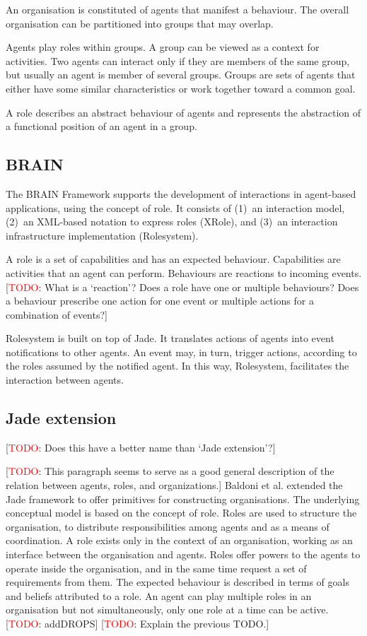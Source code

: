 \documentclass{article}
\newcommand{\todo}[1]{[\textcolor{red}{TODO}: #1]}
\begin{document}
An organisation is constituted of agents that manifest a behaviour.
The overall organisation can be partitioned into groups that may
overlap. 

Agents play roles within groups. A group can be viewed as a
context for activities. Two agents can interact only if they are
members of the same group, but usually an agent is member of
several groups. Groups are sets of agents that either have some
similar characteristics or work together toward a common goal.

A role describes an abstract behaviour of agents and represents the
abstraction of a functional position of an agent in a group.

\subsection{BRAIN} 

The BRAIN Framework supports the development of interactions
in agent-based applications, using the concept of role. It
consists of (1)~an interaction model, (2)~an XML-based notation
to express roles (XRole), and (3)~an interaction infrastructure
implementation (Rolesystem).

A role is a set of capabilities and has an expected behaviour.
Capabilities are activities that an agent can perform. Behaviours
are reactions to incoming events. \todo{What is a `reaction'?
Does a role have one or multiple behaviours? Does a behaviour
prescribe one action for one event or multiple actions for a
combination of events?}

Rolesystem is built on top of Jade. It translates actions of
agents into event notifications to other agents. An event may,
in turn, trigger actions, according to the roles assumed by
the notified agent. In this way, Rolesystem, facilitates the
interaction between agents.

\subsection{Jade extension}

\todo{Does this have a better name than `Jade extension'?}

\todo{This paragraph seems to serve as a good general description
of the relation between agents, roles, and organizations.}
Baldoni et al. extended the Jade framework to offer primitives
for constructing organisations. The underlying conceptual model
is based on the concept of role. Roles are used to structure the
organisation, to distribute responsibilities among agents and as
a means of coordination. A role exists only in the context of an
organisation, working as an interface between the organisation and
agents. Roles offer powers to the agents to operate inside the
organisation, and in the same time request a set of requirements
from them. The expected behaviour is described in terms of goals and
beliefs attributed to a role. An agent can play multiple roles in an
organisation but not simultaneously, only one role at a time can be
active. \todo{addDROPS} \todo{Explain the previous TODO.}
\end{document}
